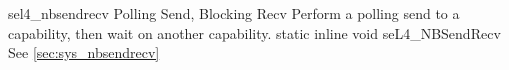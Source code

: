 %
%
%
%

\apidoc
{sel4_nbsendrecv}
{Polling Send, Blocking Recv}
{Perform a polling send to a capability, then wait on another capability.}
{static inline void seL4\_NBSendRecv}
{
}
{\noret}
{See \autoref{sec:sys_nbsendrecv}}
